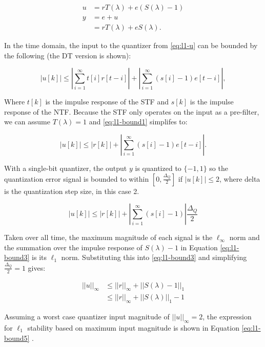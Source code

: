 \begin{align}
	u &= rT(\lambda) + e\left(S(\lambda) - 1\right) \label{eq:l1-u} \\
	y &= e + u \nonumber \\
	&= rT(\lambda) + eS(\lambda). \nonumber
\end{align}

In the time domain, the input to the quantizer from \autoref{eq:l1-u} can be bounded by the following (the \gls{DT} version is shown):

\begin{equation}
	\left|u[k]\right| \leq \left|\sum_{i=1}^{\infty} t[i]r[t - i]\right| + \left|\sum_{i=1}^{\infty} \left(s[i] - 1\right)e[t - i]\right|, \label{eq:l1-bound1}
\end{equation}

Where $t[k]$ is the impulse response of the \gls{STF} and $s[k]$ is the impulse response of the \gls{NTF}. Because the \gls{STF} only operates on the input as a pre-filter, we can assume $T(\lambda) = 1$ and \autoref{eq:l1-bound1} simplifes to:

\begin{equation}
	\left|u[k]\right| \leq |r[k]| + \left|\sum_{i=1}^{\infty} \left(s[i] - 1\right)e[t - i]\right|. \label{eq:l1-bound2}
\end{equation}

With a single-bit quantizer, the output $y$ is quantized to $\{-1, 1\}$ so the quantization error signal is bounded to within $[0, \frac{\Delta_Q}{2}]$ if $|u[k]| \leq 2$, where \gls{delta} is the quantization step size, in this case 2.

\begin{equation} 
	\left|u[k]\right| \leq |r[k]| + \left|\sum_{i=1}^{\infty} \left(s[i] - 1\right)\right|\frac{\Delta_Q}{2} \label{eq:l1-bound3}
\end{equation}

Taken over all time, the maximum magnitude of each signal is the $\ell_\infty$ norm and the summation over the impulse response of $S(\lambda) - 1$ in Equation \ref{eq:l1-bound3} is its $\ell_1$ norm. Substituting this into \autoref{eq:l1-bound3} and simplifying $\frac{\Delta_Q}{2} = 1$ gives:

\begin{align*}
	||u||_\infty &\leq ||r||_\infty + ||S(\lambda) - 1||_1 \\
	&\leq ||r||_\infty + ||S(\lambda)||_1 - 1	
\end{align*}

Assuming a worst case quantizer input magnitude of $||u||_\infty = 2$, the expression for $\ell_1$ stability based on maximum input magnitude is shown in Equation \ref{eq:l1-bound5} \cite{Anastassiou1989}.

